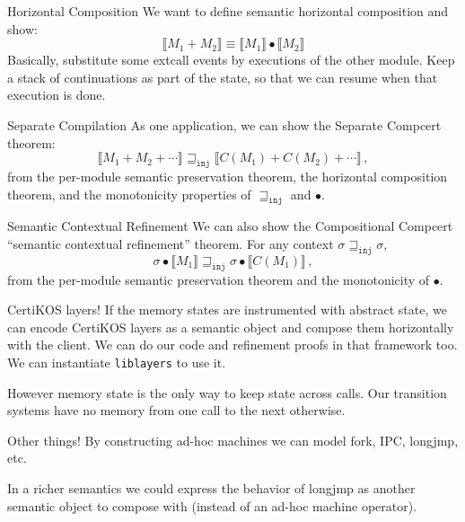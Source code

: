\documentclass[handout]{beamer}
\newcommand{\kw}[1]{\texttt{#1}}
\begin{document}
\begin{frame}{Horizontal Composition} %
We want to define semantic horizontal composition and show:
\[
  \llbracket M_1 + M_2 \rrbracket \equiv
  \llbracket M_1 \rrbracket \bullet
  \llbracket M_2 \rrbracket
\]
Basically,
substitute some extcall events by executions of the other module.
Keep a stack of continuations
as part of the state,
so that we can resume when that execution is done.
\end{frame}

\begin{frame}{Separate Compilation} %
As one application, we can show the Separate Compcert theorem:
\[ \llbracket M_1 + M_2 + \cdots \rrbracket \sqsupseteq_\kw{inj}
   \llbracket C(M_1) + C(M_2) + \cdots \rrbracket \,, \]
from the per-module semantic preservation theorem,
the horizontal composition theorem, and
the monotonicity properties of $\sqsupseteq_\kw{inj}$ and $\bullet$.
\end{frame}

\begin{frame}{Semantic Contextual Refinement} %
We can also show the Compositional Compcert ``semantic contextual refinement''
theorem.
For any context $\sigma \sqsupseteq_\kw{inj} \sigma$,
\[
  \sigma \bullet \llbracket M_1 \rrbracket \sqsupseteq_\kw{inj}
  \sigma \bullet \llbracket C(M_1) \rrbracket \,,
\]
from the per-module semantic preservation theorem
and the monotonicity of $\bullet$.
\end{frame}

\begin{frame}{CertiKOS layers!} %
If the memory states are instrumented with abstract state,
we can encode CertiKOS layers as a semantic object
and compose them horizontally with the client.
We can do our code and refinement proofs
in that framework too.
We can instantiate \kw{liblayers} to use it.

However memory state is the only way to keep state across calls.
Our transition systems have no memory from one call to the next otherwise.
\end{frame}

\begin{frame}{Other things!} %
By constructing ad-hoc machines we can model
fork, IPC, longjmp, etc.

In a richer semantics we could express the behavior
of longjmp as another semantic object to compose with
(instead of an ad-hoc machine operator).
\end{frame}
\end{document}
